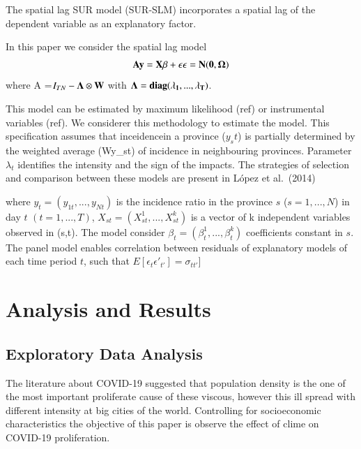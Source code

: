 \documentclass[]{elsarticle} %
\begin{document}
The spatial lag SUR model (SUR-SLM) incorporates a spatial lag of the
dependent variable as an explanatory factor.

In this paper we consider the spatial lag model \begin{equation}
\bf{A}y = X \beta + \epsilon \\
\epsilon =N(0,\Omega)
\label{eq:sur-slm}
\end{equation} where A =\(I_{TN}-\bf{\Lambda} \otimes W\) with
\(\bf{\Lambda} = diag(\lambda_1,...,\lambda_T)\).

This model can be estimated by maximum likelihood (ref) or instrumental
variables (ref). We considerer this methodology to estimate the model.
This specification assumes that inceidencein a province (\(y_st\)) is
partially determined by the weighted average (Wy\_st) of incidence in
neighbouring provinces. Parameter \(\lambda_t\) identifies the intensity
and the sign of the impacts. The strategies of selection and comparison
between these models are present in López et al.~(2014)

where \(y_{t}=(y_{1t},...,y_{Nt})\) is the incidence ratio in the
province \(s\) (\(s=1,...,N\)) in day \(t\) \((t=1,...,T)\),
\(X_{st}=(X^1_{st},...,X^k_{st})\) is a vector of k independent
variables observed in (s,t). The model consider
\(\beta_t=(\beta^1_t,...,\beta^k_t)\) coefficients constant in \(s\).
The panel model enables correlation between residuals of explanatory
models of each time period \(t\), such that
\(E[\epsilon_t \epsilon'_{t'}]=\sigma_{tt'}]\)

\hypertarget{analysis-and-results}{%
\section{Analysis and Results}\label{analysis-and-results}}

\hypertarget{exploratory-data-analysis}{%
\subsection{Exploratory Data Analysis}\label{exploratory-data-analysis}}

The literature about COVID-19 suggested that population density is the
one of the most important proliferate cause of these viscous, however
this ill spread with different intensity at big cities of the world.
Controlling for socioeconomic characteristics the objective of this
paper is observe the effect of clime on COVID-19 proliferation.
\end{document}
